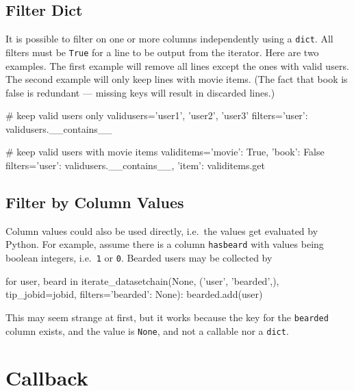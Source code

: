 \subsection*{Filter Dict}

It is possible to filter on one or more columns independently using a
\texttt{dict}.  All filters must be \texttt{True} for a line to be
output from the iterator.  Here are two examples.  The first example
will remove all lines except the ones with valid users.  The second
example will only keep lines with movie items.  (The fact that book is
false is redundant --- missing keys will result in discarded lines.)

\begin{python}
# keep valid users only
validusers={'user1', 'user2', 'user3'}
filters={'user': validusers.__contains__}

# keep valid users with movie items
validitems={'movie': True, 'book': False}
filters={'user': validusers.__contains__, 'item': validitems.get}
\end{python}




\subsection*{Filter by Column Values}


Column values could also be used directly, i.e.\ the values get
evaluated by Python.  For example, assume there is a column
\texttt{hasbeard} with values being boolean integers, i.e.\ \texttt{1}
or \texttt{0}.  Bearded users may be collected by
\begin{python}
for user, beard in iterate_datasetchain(None, ('user', 'bearded',), tip_jobid=jobid,
                                       filters={'bearded': None}):
    bearded.add(user)
\end{python}
This may seem strange at first, but it works because the key
for the \texttt{bearded} column exists, and the value is
\texttt{None}, and not a callable nor a \texttt{dict}.





    


\section{Callback}
\label{sec:callback}

